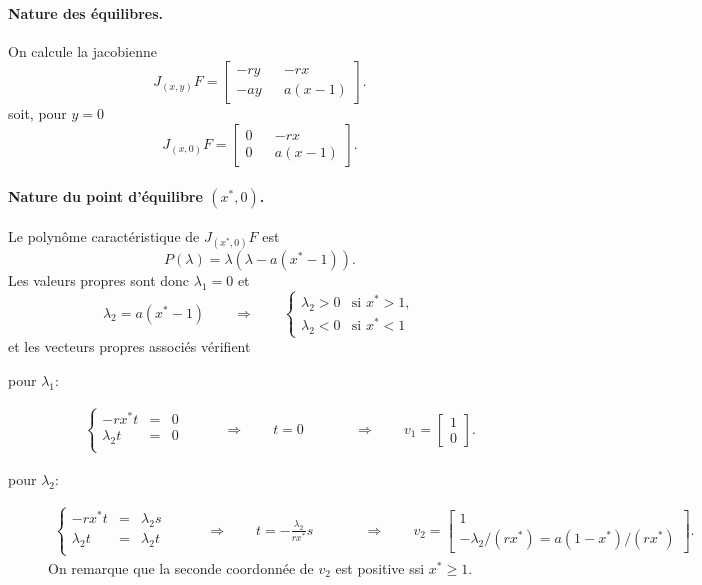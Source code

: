 \paragraph*{Nature des équilibres.}
On calcule la jacobienne
$$
J_{(x, y)}F = 
  \left[\begin{array}{rcr} 
    - r y & & -r x \\
    - a y & & a (x - 1)
  \end{array}\right].
$$
soit, pour $y = 0$
$$
J_{(x, 0)}F = 
  \left[\begin{array}{rcr} 
    0 & & -r x \\
    0 & & a (x - 1)
  \end{array}\right].
$$

\paragraph*{Nature du point d'équilibre $(x^*, 0)$.}
Le polynôme caractéristique de $J_{(x^*, 0)}F$ est
$$
P(\lambda) = \lambda (\lambda - a (x^* - 1)).
$$
Les valeurs propres sont donc $\lambda_1 = 0$ et 
$$
\lambda_2 = a (x^* - 1) 
\qquad \Rightarrow \qquad 
\left\{\begin{array}{ll} 
  \lambda_2 > 0 & \text{si } x^* > 1, \\
  \lambda_2 < 0 & \text{si } x^* < 1
\end{array} \right.
$$
et les vecteurs propres associés vérifient 
\begin{description}
  \item[pour $\lambda_1$:] 
  \begin{align*}
  \left\{\begin{array}{rcl}
      -r x^* t & = & 0 \\
      \lambda_2 t & = & 0 \\
    \end{array}\right.
    \qquad & \Rightarrow \qquad 
    t = 0 &
    \qquad & \Rightarrow \qquad 
    v_1 = \left[\begin{array}{c} 1 \\ 0 \end{array}\right].
    \end{align*}
  \item[pour $\lambda_2$:]
    \begin{align*}
      \left\{\begin{array}{rcl}
          -r x^* t & = & \lambda_2 s \\
          \lambda_2 t & = & \lambda_2 t \\
        \end{array}\right.
        \qquad & \Rightarrow \qquad 
        t = - \frac{\lambda_2}{rx^*} s &
        \qquad & \Rightarrow \qquad 
        v_2 = \left[\begin{array}{l} 1 \\ -\lambda_2/(rx^*) = a(1 -x^*)/(rx^*) \end{array}\right].
    \end{align*}  
    On remarque que la seconde coordonnée de $v_2$ est positive ssi $x^* \geq 1$.
\end{description}

